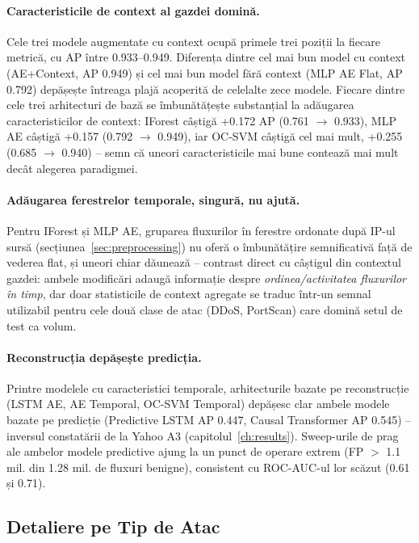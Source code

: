\paragraph{Caracteristicile de context al gazdei domină.} Cele trei modele augmentate cu context ocupă primele trei poziții la fiecare metrică, cu AP între 0.933--0.949. Diferența dintre cel mai bun model cu context (AE+Context, AP 0.949) și cel mai bun model fără context (MLP AE Flat, AP 0.792) depășește întreaga plajă acoperită de celelalte zece modele.
Fiecare dintre cele trei arhitecturi de bază se îmbunătățește substanțial la adăugarea caracteristicilor de context: IForest câștigă +0.172 AP (0.761 $\to$ 0.933), MLP AE câștigă +0.157 (0.792 $\to$ 0.949), iar OC-SVM câștigă cel mai mult, +0.255 (0.685 $\to$ 0.940) -- semn că uneori caracteristicile mai bune contează mai mult decât alegerea paradigmei.

\paragraph{Adăugarea ferestrelor temporale, singură, nu ajută.} Pentru IForest și MLP AE, gruparea fluxurilor în ferestre ordonate după IP-ul sursă (secțiunea~\ref{sec:preprocessing}) nu oferă o îmbunătățire semnificativă față de vederea flat, și uneori chiar dăunează -- contrast direct cu câștigul din contextul gazdei: ambele modificări adaugă informație despre \emph{ordinea/activitatea fluxurilor în timp}, dar doar statisticile de context agregate se traduc într-un semnal utilizabil pentru cele două clase de atac (DDoS, PortScan) care domină setul de test ca volum.

\paragraph{Reconstrucția depășește predicția.} Printre modelele cu caracteristici temporale, arhitecturile bazate pe reconstrucție (LSTM AE, AE Temporal, OC-SVM Temporal) depășesc clar ambele modele bazate pe predicție (Predictive LSTM AP 0.447, Causal Transformer AP 0.545) -- inversul constatării de la Yahoo A3 (capitolul~\ref{ch:results}). Sweep-urile de prag ale ambelor modele predictive ajung la un punct de operare extrem (FP $>$ 1.1 mil. din 1.28 mil. de fluxuri benigne), consistent cu ROC-AUC-ul lor scăzut (0.61 și 0.71).

\subsection{Detaliere pe Tip de Atac}
\label{sec:cic-per-attack}

